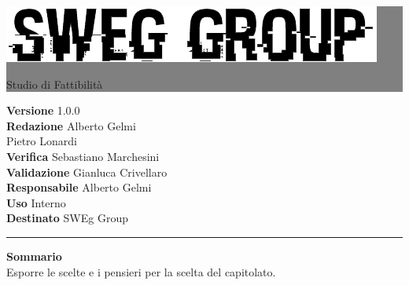\documentclass[12pt,a4paper,titlepage]{article}
\newcommand{\HRule}[1]{\hfill \rule{0.2\linewidth}{#1}} %
\begin{document}
	
	\thispagestyle{empty} %
	
	
	\colorbox{grey}{
		\parbox[t]{1.0\linewidth}{
			\centering \fontsize{50pt}{80pt}\selectfont %
			\vspace*{0.7cm} %
			
			\raggedleft
			\includegraphics[width=0.7\linewidth]{../../LogoSWEgGroupSFONDOVUOTO}
			
			\hfill Studio di Fattibilità \\
			
			\vspace*{0.7cm} %
		}
	}
	
	
	\vfill %
	
	
	{\centering \large 
		\hfill \textbf{Versione} 1.0.0 \\
		\hfill \textbf{Redazione} Alberto Gelmi \\
		\hfill Pietro Lonardi \\
		\hfill \textbf{Verifica} Sebastiano Marchesini \\
		\hfill \textbf{Validazione} Gianluca Crivellaro \\
		\hfill \textbf{Responsabile} Alberto Gelmi \\
		\hfill \textbf{Uso} Interno\\
		\hfill \textbf{Destinato} SWEg Group\\ 
		
		\HRule{1pt}
		
		\textbf{Sommario} \\
		Esporre le scelte e i pensieri per la scelta del capitolato.
		
	} %
	
\end{document}
